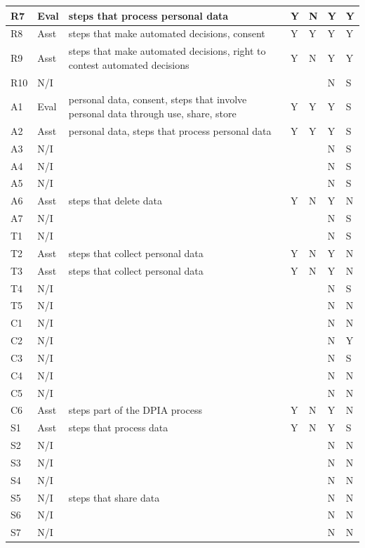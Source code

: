 \begin{table}[htbp]
\begin{tabularx}{\textwidth}{|l|l|X|l|l|l|l|}
R7 & Eval & steps that process personal data & Y & N & Y & Y \\ \hline
R8 & Asst & steps that make automated decisions, consent & Y & Y & Y & Y \\ \hline
R9 & Asst & steps that make automated decisions, right to contest automated decisions & Y & N & Y & Y \\ \hline
R10 & N/I &  &  &  & N & S \\ \hline
A1 & Eval & personal data, consent, steps that involve personal data through use, share, store & Y & Y & Y & S \\ \hline
A2 & Asst & personal data, steps that process personal data & Y & Y & Y & S \\ \hline
A3 & N/I &  &  &  & N & S \\ \hline
A4 & N/I &  &  &  & N & S \\ \hline
A5 & N/I &  &  &  & N & S \\ \hline
A6 & Asst & steps that delete data & Y & N & Y & N \\ \hline
A7 & N/I &  &  &  & N & S \\ \hline
T1 & N/I &  &  &  & N & S \\ \hline
T2 & Asst & steps that collect personal data & Y & N & Y & N \\ \hline
T3 & Asst & steps that collect personal data & Y & N & Y & N \\ \hline
T4 & N/I &  &  &  & N & S \\ \hline
T5 & N/I &  &  &  & N & N \\ \hline
C1 & N/I &  &  &  & N & N \\ \hline
C2 & N/I &  &  &  & N & Y \\ \hline
C3 & N/I &  &  &  & N & S \\ \hline
C4 & N/I &  &  &  & N & N \\ \hline
C5 & N/I &  &  &  & N & N \\ \hline
C6 & Asst & steps part of the DPIA process & Y & N & Y & N \\ \hline
S1 & Asst & steps that process data & Y & N & Y & S \\ \hline
S2 & N/I &  &  &  & N & N \\ \hline
S3 & N/I &  &  &  & N & N \\ \hline
S4 & N/I &  &  &  & N & N \\ \hline
S5 & N/I & steps that share data &  &  & N & N \\ \hline
S6 & N/I &  &  &  & N & N \\ \hline
S7 & N/I &  &  &  & N & N \\ \hline

\end{tabularx}
\end{table}
